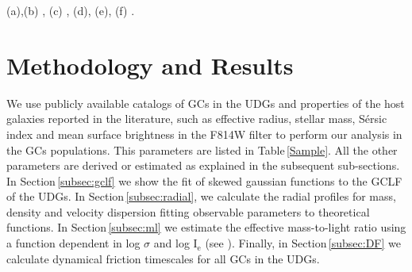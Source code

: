 \documentclass[baaa]{baaa}
\begin{document}
\begin{table*}[]
{    (a)\cite{Montes_2021_DF2},(b) \cite{vanDokkum2018_df2}, (c) \cite{Montes_2021_DF4}, (d)\cite{vanDokkum2019_df4}, (e)\cite{Saifollahi2022}, (f) \cite{Janssens2022}.}
    \label{Sample}
\end{table*}


\section{Methodology and Results}\label{sec:methods}
We use publicly available catalogs of GCs in the UDGs and properties of the host galaxies reported in the literature, such as effective radius, stellar mass, S\'ersic index and mean surface brightness in the F814W filter to perform our analysis in the GCs populations. This parameters are listed in Table\,\ref{Sample}. All the other parameters are derived or estimated as explained in the subsequent sub-sections. In Section\,\ref{subsec:gclf} we show the fit of skewed gaussian functions to the GCLF of the UDGs. In Section\,\ref{subsec:radial}, we calculate the radial profiles for mass, density and velocity dispersion fitting observable parameters to theoretical functions. In Section\,\ref{subsec:ml} we estimate the effective mass-to-light ratio using a function dependent in log $\sigma$ and log I$_\text{e}$ (see \citealt{Zaritsky2022_mass_estimation}). Finally, in Section\,\ref{subsec:DF} we calculate dynamical friction timescales for all GCs in the UDGs.
\end{document}
